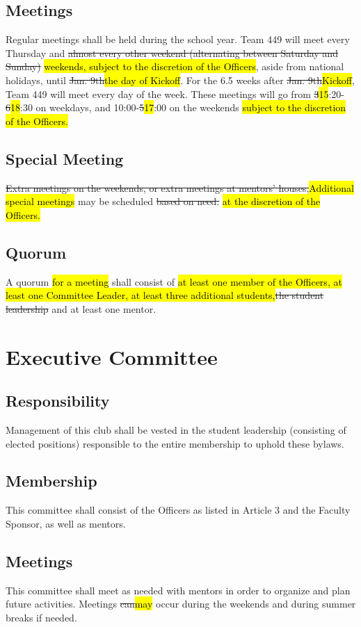 \documentclass[12pt, a4paper]{article}
\begin{document}
\subsection{Meetings}
Regular meetings shall be held during the school year. 
Team 449 will meet every Thursday and \st{almost every other weekend (alternating between Saturday and Sunday)} \hl{weekends, subject to the discretion of the Officers}, aside from national holidays, until \st{Jan. 9th}\hl{the day of Kickoff}. 
For the 6.5 weeks after \st{Jan. 9th}\hl{Kickoff},  Team 449 will meet every day of the week.  
These meetings will go from \st{3}\hl{15}:20-\st{6}\hl{18}:30 on weekdays, and 10:00-\st{5}\hl{17}:00 on the weekends\hl{ subject to the discretion of the Officers.}
\subsection{Special Meeting}
\st{Extra meetings on the weekends, or extra meetings at mentors’ houses,}\hl{Additional special meetings} may be scheduled \st{based on need.} \hl{at the discretion of the Officers.}
\subsection{Quorum}
A quorum \hl{for a meeting} shall consist of \hl{at least one member of the Officers, at least one Committee Leader, at least three additional students,}\st{the student leadership} and at least one mentor.
\section{Executive Committee}
\subsection{Responsibility}
Management of this club shall be vested in the student leadership (consisting of elected positions) responsible to the entire membership to uphold these bylaws.
\subsection{Membership}
This committee shall consist of the Officers as listed in Article 3 and the Faculty Sponsor, as well as mentors.
\subsection{Meetings}
This committee shall meet as needed with mentors in order to organize and plan future activities. Meetings \st{can}\hl{may} occur during the weekends and during summer breaks if needed.
\end{document}
